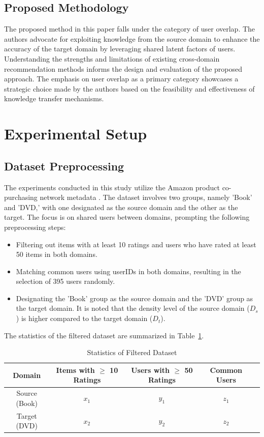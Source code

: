 \documentclass{article}
\begin{document}
\subsection{Proposed Methodology}
The proposed method in this paper falls under the category of user overlap. The authors advocate for exploiting knowledge from the source domain to enhance the accuracy of the target domain by leveraging shared latent factors of users. Understanding the strengths and limitations of existing cross-domain recommendation methods informs the design and evaluation of the proposed approach. The emphasis on user overlap as a primary category showcases a strategic choice made by the authors based on the feasibility and effectiveness of knowledge transfer mechanisms.

\section{Experimental Setup}

\subsection{Dataset Preprocessing}

The experiments conducted in this study utilize the Amazon product co-purchasing network metadata \cite{amazon-meta}. The dataset involves two groups, namely 'Book' and 'DVD,' with one designated as the source domain and the other as the target. The focus is on shared users between domains, prompting the following preprocessing steps:

\begin{itemize}
    \item Filtering out items with at least 10 ratings and users who have rated at least 50 items in both domains.
    \item Matching common users using userIDs in both domains, resulting in the selection of 395 users randomly.
    \item Designating the 'Book' group as the source domain and the 'DVD' group as the target domain. It is noted that the density level of the source domain ($D_s$) is higher compared to the target domain ($D_t$).
\end{itemize}

The statistics of the filtered dataset are summarized in Table~\ref{tab:dataset-stats}.

\begin{table}[ht]
    \centering
    \caption{Statistics of Filtered Dataset}
    \label{tab:dataset-stats}
    \begin{tabular}{|c|c|c|c|c|}
        \hline
        Domain & Items with $\geq$ 10 Ratings & Users with $\geq$ 50 Ratings & Common Users \\
        \hline
        Source (Book) & $x_1$ & $y_1$ & $z_1$ \\
        Target (DVD) & $x_2$ & $y_2$ & $z_2$ \\
        \hline
    \end{tabular}
\end{table}
\end{document}
